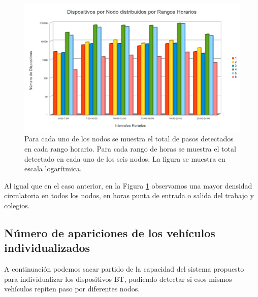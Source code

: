 \documentclass[twocolumn,twoside]{Jornadas}
\begin{document}
 \begin{figure}[htb]
 \begin{center}
 \includegraphics[scale=0.20]{VehiculosPorHoras.jpg}
 \caption{Para cada uno de los nodos se muestra el total de pasos detectados en cada rango horario. Para cada rango de horas se muestra el total detectado en cada uno de los seis nodos. La figura se muestra en escala logarítmica.
 \label{VehiculosPorHoras}}
 \end{center}
 \end{figure}
 
Al igual que en el caso anterior, en la Figura \ref{VehiculosPorHoras} observamos una mayor densidad circulatoria en todos los nodos, en horas punta de entrada o salida del trabajo y colegios.



\subsection{Número de apariciones de los vehículos individualizados}

A continuación podemos sacar partido de la capacidad del sistema propuesto para individualizar los dispositivos BT, pudiendo detectar si esos mismos 
vehículos repiten paso por diferentes nodos.
\end{document}
